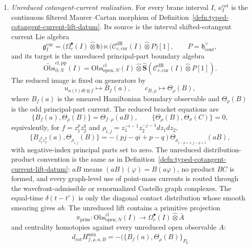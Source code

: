 \begin{defn}
\begin{enumerate}[label=\textup{(D\arabic*)}]
  \item \emph{Unreduced cotangent-current realization.}
    For every brane interval \(I\), \(\kappa_I^{\mathrm{cot}}\) is the
    continuous filtered Maurer--Cartan morphism of
    Definition~\ref{defn:typed-cotangent-current-lift-datum}.  Its
    source is the interval shifted-cotangent current Lie algebra
    \[
      \mathfrak g_I^{\mathrm{cur}}
      =
      \bigl(\Omega^\bullet_c(I)\widehat\otimes\mathfrak h\bigr)
      \ltimes
      \bigl(\mathcal C^{\mathrm{dR}}_{c,\mathrm{cur}}(I)
      \widehat\otimes P\bigr)[1],
      \qquad P=\mathfrak h^\vee_{\mathrm{cont}},
    \]
    and its target is the unreduced principal-part boundary algebra
    \[
      \widetilde{\mathrm{Obs}}^{\mathrm{cl,pp}}_{\partial,N}(I)
      =
      \mathrm{Obs}^{\mathrm{cl}}_{\mathrm{open},N}(I)
      \widehat\otimes
      \widehat{\mathbf S}\!\left(
        \mathcal C^{\mathrm{dR}}_{c,\mathrm{cur}}(I)
        \widehat\otimes P[1]\right).
    \]
    The reduced image is fixed on generators by
    \[
      u_{a(t)dt\otimes f}\longmapsto B_f(a),
      \qquad
      c_{B,\rho}\longmapsto\Theta_\rho(B),
    \]
    where \(B_f(a)\) is the smeared Hamiltonian boundary observable and
    \(\Theta_\rho(B)\) is the odd principal-part current.  The reduced
    bracket equations are
    \[
      \{B_f(a),\Theta_\rho(B)\}
      =
      \Theta_{f\cdot\rho}(aB),
      \qquad
      \{\Theta_\rho(B),\Theta_\sigma(C)\}=0,
    \]
    equivalently, for \(f=z_1^pz_2^q\) and
    \(\rho_{i,j}=z_1^{-i-1}z_2^{-j-1}dz_1dz_2\),
    \[
      \{B_{z_1^pz_2^q}(a),\Theta_{\rho_{i,j}}(B)\}
      =
      -(pj-qi+p-q)
      \Theta_{\rho_{i-p+1,j-q+1}}(aB),
    \]
    with negative-index principal parts set to zero.  The unreduced
    distribution-product convention is the same as in
    Definition~\ref{defn:typed-cotangent-current-lift-datum}: \(aB\)
    means \((aB)(\varphi)=B(a\varphi)\), no product \(BC\) is formed, and
    every graph-level use of point-mass currents is routed through the
    wavefront-admissible or renormalized Costello graph complexes.  The
    equal-time \(\delta(t-t')\) is only the diagonal contact distribution
    whose smooth smearing gives \(ab\).
    The unreduced
    lift contains a primitive projection
    \[
      \pi_{\mathrm{prim}}\colon
      \mathrm{Obs}^{\mathrm{cl}}_{\mathrm{open},N}(I)
      \longrightarrow
      \Omega^\bullet_c(I)\widehat\otimes \bar A
    \]
	    and centrality homotopies against every unreduced open observable
	    \(A\):
	    \[
	      d_{\mathrm{cot}}H^{\mathrm{mix}}_{f,\rho,a,B}
      =
      -\bigl(\{B_f(a),\Theta_\rho(B)\}_{P_0}
\]
\end{enumerate}
\end{defn}

